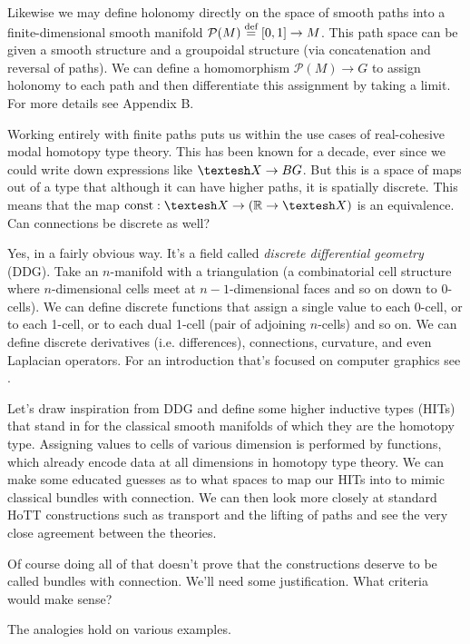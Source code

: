 \documentclass[12pt]{article}
\begin{document}
Likewise we may define holonomy directly on the space of smooth paths into a finite-dimensional smooth manifold \( \mathcal{P}(M)\stackrel{\textup{def}}{=} [0,1]\to M \). This path space can be given a smooth structure and a groupoidal structure (via concatenation and reversal of paths). We can define a homomorphism \( \mathcal{P}(M) \to G\) to assign holonomy to each path and then differentiate this assignment by taking a limit. For more details see \cite{freed1992classical} Appendix B.

Working entirely with finite paths puts us within the use cases of real-cohesive modal homotopy type theory. This has been known for a decade, ever since we could write down expressions like \( \shape X\to BG \). But this is a space of maps out of a type that although it can have higher paths, it is spatially discrete. This means that the map \( \const:\shape X\to (\rr\to\shape X) \) is an equivalence. Can connections be discrete as well?

Yes, in a fairly obvious way. It's a field called \emph{discrete differential geometry} (DDG). Take an \( n \)-manifold with a triangulation (a combinatorial cell structure where \( n \)-dimensional cells meet at \( n-1 \)-dimensional faces and so on down to 0-cells). We can define discrete functions that assign a single value to each 0-cell, or to each 1-cell, or to each dual 1-cell (pair of adjoining \( n \)-cells) and so on. We can define discrete derivatives (i.e. differences), connections, curvature, and even Laplacian operators. For an introduction that's focused on computer graphics see \cite{crane_connections} \cite{crane_ddg}.

Let's draw inspiration from DDG and define some higher inductive types (HITs) that stand in for the classical smooth manifolds of which they are the homotopy type. Assigning values to cells of various dimension is performed by functions, which already encode data at all dimensions in homotopy type theory. We can make some educated guesses as to what spaces to map our HITs into to mimic classical bundles with connection. We can then look more closely at standard HoTT constructions such as transport and the lifting of paths and see the very close agreement between the theories.

Of course doing all of that doesn't prove that the constructions deserve to be called bundles with connection. We'll need some justification. What criteria would make sense?

\begin{myclaim}
The analogies hold on various examples.
\end{myclaim}
\end{document}
